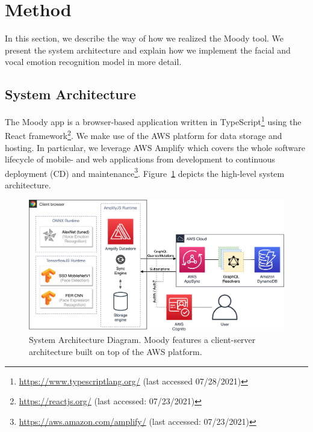 \section{Method}
\label{sec:method}
In this section, we describe the way of how we realized the Moody tool. We present the system architecture and explain how we implement the facial and vocal emotion recognition model in more detail.

\subsection{System Architecture}
\label{subsec:method_system_architecture}
The Moody app is a browser-based application written in TypeScript\footnote{\url{https://www.typescriptlang.org/} (last accessed 07/28/2021)} using the React framework\footnote{\url{https://reactjs.org/} (last accessed: 07/23/2021)}. We make use of the AWS platform for data storage and hosting. In particular, we leverage AWS Amplify which covers the whole software lifecycle of mobile- and web applications from development to continuous deployment (CD) and maintenance\footnote{\url{https://aws.amazon.com/amplify/} (last accessed: 07/23/2021)}. Figure~\ref{fig:system_architecture} depicts the high-level system architecture.

\begin{figure}
\centering
\includegraphics[width=1\textwidth]{assets/system_architecture.png}
\caption{System Architecture Diagram. Moody features a client-server architecture built on top of the AWS platform.}
\label{fig:system_architecture}
\end{figure}

